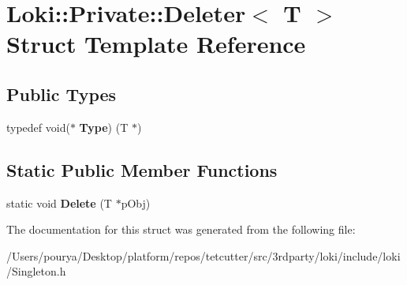 \hypertarget{structLoki_1_1Private_1_1Deleter}{}\section{Loki\+:\+:Private\+:\+:Deleter$<$ T $>$ Struct Template Reference}
\label{structLoki_1_1Private_1_1Deleter}
\subsection*{Public Types}
\begin{DoxyCompactItemize}
\item 
\hypertarget{structLoki_1_1Private_1_1Deleter_a6f00534f13d884a49c84ec190ddf8c35}{}typedef void($\ast$ {\bfseries Type}) (T $\ast$)\label{structLoki_1_1Private_1_1Deleter_a6f00534f13d884a49c84ec190ddf8c35}

\end{DoxyCompactItemize}
\subsection*{Static Public Member Functions}
\begin{DoxyCompactItemize}
\item 
\hypertarget{structLoki_1_1Private_1_1Deleter_ab68851cf3f70784f547da1105561e0ac}{}static void {\bfseries Delete} (T $\ast$p\+Obj)\label{structLoki_1_1Private_1_1Deleter_ab68851cf3f70784f547da1105561e0ac}

\end{DoxyCompactItemize}


The documentation for this struct was generated from the following file\+:\begin{DoxyCompactItemize}
\item 
/\+Users/pourya/\+Desktop/platform/repos/tetcutter/src/3rdparty/loki/include/loki/Singleton.\+h\end{DoxyCompactItemize}
